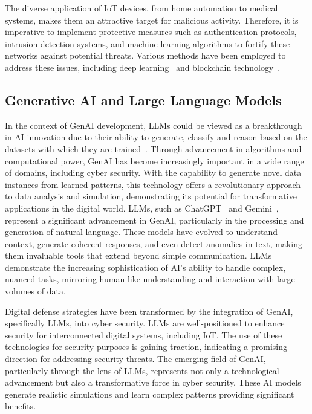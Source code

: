 The diverse application of IoT devices, from home automation to medical systems, makes them an attractive target for malicious activity.
Therefore, it is imperative to implement protective measures such as authentication protocols, intrusion detection systems, and machine learning algorithms to fortify these networks against potential threats.
Various methods have been employed to address these issues, including deep learning~\citet{9060970} and blockchain technology~\citet{10.1145/3320154.3320163}.
%
\subsection{Generative AI and Large Language Models}
%
In the context of GenAI development, LLMs could be viewed as a breakthrough in AI innovation due to their ability to generate, classify and reason based on the datasets with which they are trained~\citet{jo2023promise}.
Through advancement in algorithms and computational power, GenAI has become increasingly important in a wide range of domains, including cyber security.
With the capability to generate novel data instances from learned patterns, this technology offers a revolutionary approach to data analysis and simulation, demonstrating its potential for transformative applications in the digital world.
LLMs, such as ChatGPT~\citet{openai2024gpt4} and Gemini~\citet{10113601}, represent a significant advancement in GenAI, particularly in the processing and generation of natural language.
These models have evolved to understand context, generate coherent responses, and even detect anomalies in text, making them invaluable tools that extend beyond simple communication.
LLMs demonstrate the increasing sophistication of AI's ability to handle complex, nuanced tasks, mirroring human-like understanding and interaction with large volumes of data.

Digital defense strategies have been transformed by the integration of GenAI, specifically LLMs, into cyber security.
LLMs are well-positioned to enhance security for interconnected digital systems, including IoT.
The use of these technologies for security purposes is gaining traction, indicating a promising direction for addressing security threats.
The emerging field of GenAI, particularly through the lens of LLMs, represents not only a technological advancement but also a transformative force in cyber security.
These AI models generate realistic simulations and learn complex patterns providing significant benefits.
